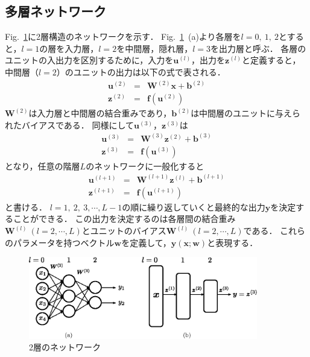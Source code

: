 \documentclass[a4paper,10pt]{jsarticle}
\begin{document}
\subsection{多層ネットワーク}
Fig.~\ref{fig:2層のネットワーク}に2層構造のネットワークを示す．
Fig.~\ref{fig:2層のネットワーク}~(a)より各層を$l=0,\ 1,\ 2$とすると，$l=1$の層を入力層，$l=2$を中間層，隠れ層，$l=3$を出力層と呼ぶ．
各層のユニットの入出力を区別するために，入力を$\bm{u}^{(l)}$，出力を$\bm{z}^{(l)}$と定義すると，中間層（$l=2$）のユニットの出力は以下の式で表される．
\begin{eqnarray}
\label{eq:3a}
  \bm{u}^{(2)} &=& \bm{W}^{(2)}\bm{x} + \bm{b}^{(2)} \\
  \bm{z}^{(2)} &=& \bm{f}(\bm{u}^{(2)})
\end{eqnarray}
$\bm{W}^{(2)}$は入力層と中間層の結合重みであり，$\bm{b}^{(2)}$は中間層のユニットに与えられたバイアスである．
同様にして$\bm{u}^{(3)}$，$\bm{z}^{(3)}$は
\begin{eqnarray}
\label{eq:3b}
  \bm{u}^{(3)} &=& \bm{W}^{(3)}\bm{z}^{(2)} + \bm{b}^{(3)} \\
  \bm{z}^{(3)} &=& \bm{f}(\bm{u}^{(3)})
\end{eqnarray}
となり，任意の階層$L$のネットワークに一般化すると
\begin{eqnarray}
\label{eq:3c}
  \bm{u}^{(l+1)} &=& \bm{W}^{(l+1)}\bm{z}^{(l)} + \bm{b}^{(l+1)} \\
  \bm{z}^{(l+1)} &=& \bm{f}(\bm{u}^{(l+1)})
\end{eqnarray}
と書ける．
$l=1,\ 2,\ 3,\cdots, L-1$の順に繰り返していくと最終的な出力$\bm{y}$を決定することができる．
この出力を決定するのは各層間の結合重み$\bm{W}^{(l)}\ (l=2,\cdots, L)$とユニットのバイアス$\bm{W}^{(l)}\ (l=2,\cdots, L)$である．
これらのパラメータを持つベクトル$\bm{w}$を定義して，$\bm{y}(\bm{x};\bm{w})$と表現する．

\begin{figure}[tb]
  \begin{center}
    \includegraphics[clip,width=10cm]{fig/eps/unit.eps}
  \end{center}
  \caption{2層のネットワーク}
  \label{fig:2層のネットワーク}
\end{figure}
\end{document}
